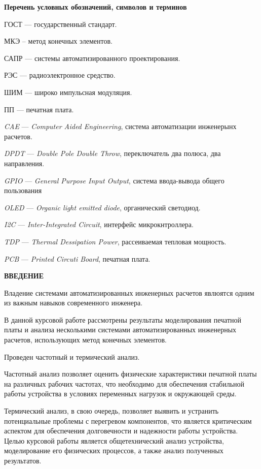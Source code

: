 \tableofcontents
\newpage
\begin{center}
\textbf{Перечень условных обозначений, символов и терминов}
\end{center}

ГОСТ — государственный стандарт.

МКЭ – метод конечных элементов.

САПР — системы автоматизированного проектирования.

РЭС — радиоэлектронное средство.

ШИМ — широко импульсная модуляция.

ПП — печатная плата.

\textit{CAE} — \textit{Computer Aided Engineering}, система автоматизации инженерынх расчетов.

\textit{DPDT} — \textit{Double Pole Double Throw}, переключатель два полюса, два направления.

\textit{GPIO} — \textit{ General Purpose Input Output}, система ввода-вывода общего пользования

\textit{OLED} — \textit{Organic light emitted diode}, органический светодиод.

\textit{I2C} — \textit{Inter-Integrated Circuit}, интерфейс микрокнтроллера.

\textit{TDP} — \textit{Thermal Dessipation Power}, рассеиваемая тепловая мощность.

\textit{PCB} — \textit{Printed Circuti Board}, печатная плата.

\newpage

\begin{center}
\textbf{ВВЕДЕНИЕ}
\end{center}

Владение системами автоматизированных инженерных расчетов явлюятся одним из важным навыков современного инженера.

В данной курсовой работе рассмотрены результаты моделирования печатной платы и анализа несколькими системами автоматизированных инженерных расчетов, использующих метод конечных элементов.

Проведен частотный и термический анализ.

Частотный анализ позволяет оценить физические характеристики печатной платы на различных рабочих частотах, что необходимо для обеспечения
стабильной работы устройства в условиях переменных нагрузок и окружающей среды.

Термический анализ, в свою очередь, позволяет выявить и устранить потенциальные проблемы с перегревом компонентов, что является критическим
аспектом для обеспечения долговечности и надежности работы устройства.
Целью курсовой работы является общетехнический анализ устройства,
моделирование его физических процессов, а также анализ полученных результатов.

\newpage